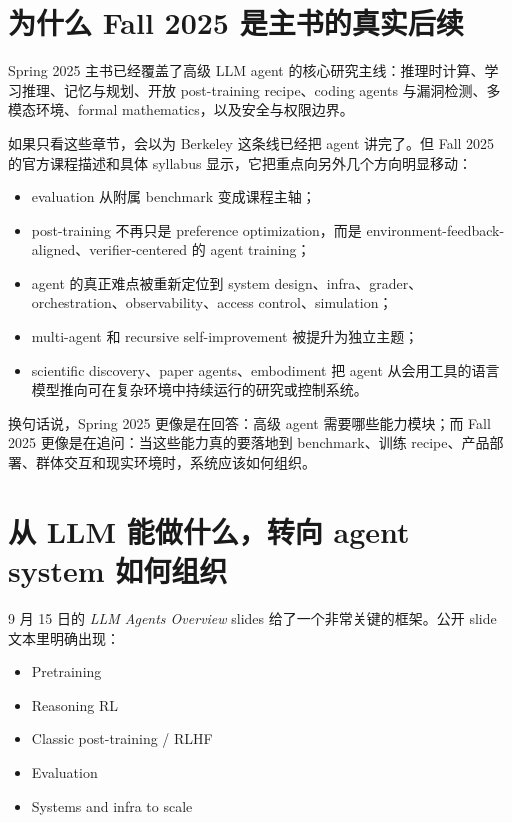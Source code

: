 \section{为什么 Fall 2025 是主书的真实后续}

Spring 2025 主书已经覆盖了高级 LLM agent 的核心研究主线：推理时计算、学习推理、记忆与规划、开放 post-training recipe、coding agents 与漏洞检测、多模态环境、formal mathematics，以及安全与权限边界。

如果只看这些章节，会以为 Berkeley 这条线已经把 agent 讲完了。但 Fall 2025 的官方课程描述和具体 syllabus 显示，它把重点向另外几个方向明显移动：

\begin{itemize}
\item evaluation 从附属 benchmark 变成课程主轴；
\item post-training 不再只是 preference optimization，而是 environment-feedback-aligned、verifier-centered 的 agent training；
\item agent 的真正难点被重新定位到 system design、infra、grader、orchestration、observability、access control、simulation；
\item multi-agent 和 recursive self-improvement 被提升为独立主题；
\item scientific discovery、paper agents、embodiment 把 agent 从会用工具的语言模型推向可在复杂环境中持续运行的研究或控制系统。
\end{itemize}

换句话说，Spring 2025 更像是在回答：高级 agent 需要哪些能力模块；而 Fall 2025 更像是在追问：当这些能力真的要落地到 benchmark、训练 recipe、产品部署、群体交互和现实环境时，系统应该如何组织。

\section{从 LLM 能做什么，转向 agent system 如何组织}

9 月 15 日的 \emph{LLM Agents Overview} slides 给了一个非常关键的框架。公开 slide 文本里明确出现：

\begin{itemize}
\item Pretraining
\item Reasoning RL
\item Classic post-training / RLHF
\item Evaluation
\item Systems and infra to scale
\end{itemize}

